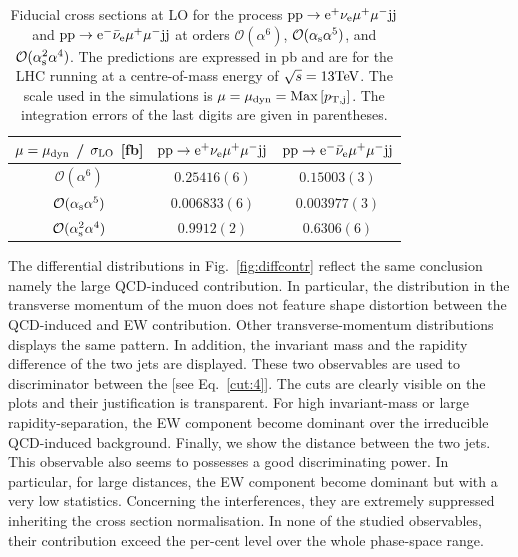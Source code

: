 \documentclass[11pt]{cernrep}
\begin{document}
\begin{table}
\begin{center} 
\begin{tabular}{ c | c | c }
 $\mu = \mu_{\rm dyn}$ / $\sigma_{\rm LO}$ [fb] & ${\rm p} {\rm p} \to {\rm e}^+  \nu_{\rm e}  \mu^+ \mu^- {\rm j} {\rm j}$  & ${\rm p} {\rm p} \to {\rm e}^-  \bar \nu_{\rm e}  \mu^+ \mu^- {\rm j} {\rm j}$  \\
  \hline\hline
  $\mathcal{O} (\alpha^6)$                        & $0.25416(6)$  & $0.15003(3)$   \\
  $\mathcal{O} (\alpha_{\rm s}\alpha^5)$          & $0.006833(6)$ & $0.003977(3)$  \\
  $\mathcal{O} (\alpha_{\rm s}^2\alpha^4)$        & $0.9912(2)$   & $0.6306(6)$   \\
  \hline
\end{tabular}
\end{center}
\caption{
Fiducial cross sections at LO for the process ${\rm p}{\rm p}\to{\rm e}^+\nu_{\rm e}\mu^+\mu^-{\rm j}{\rm j}$ and ${\rm p}{\rm p}\to{\rm e}^-\bar\nu_{\rm e}\mu^+\mu^-{\rm j}{\rm j}$ at orders $\mathcal{O} (\alpha^6)$, $\mathcal{O} (\alpha_{\rm s}\alpha^5)$, and $\mathcal{O} (\alpha_{\rm s}^2\alpha^4)$.
The predictions are expressed in pb and are for the LHC running at a centre-of-mass energy of $\sqrt{s}=13 {\rm TeV}$.
The scale used in the simulations is $\mu = \mu_{\rm dyn} = {\rm Max}\left[p_{\rm T, j}\right]$.
The integration errors of the last digits are given in parentheses.}
\label{table:xsectallLOdyn}
\end{table}

The differential distributions in Fig.~\ref{fig:diffcontr} reflect the same conclusion namely the large QCD-induced contribution.
In particular, the distribution in the transverse momentum of the muon does not feature shape distortion between the QCD-induced and EW contribution.
Other transverse-momentum distributions displays the same pattern.
In addition, the invariant mass and the rapidity difference of the two jets are displayed.
These two observables are used to discriminator between the [see Eq.~\eqref{cut:4}].
The cuts are clearly visible on the plots and their justification is transparent.
For high invariant-mass or large rapidity-separation, the EW component become dominant over the irreducible QCD-induced background.
Finally, we show the distance between the two jets.
This observable also seems to possesses a good discriminating power.
In particular, for large distances, the EW component become dominant but with a very low statistics.
Concerning the interferences, they are extremely suppressed inheriting the cross section normalisation.
In none of the studied observables, their contribution exceed the per-cent level over the whole phase-space range.
\end{document}
